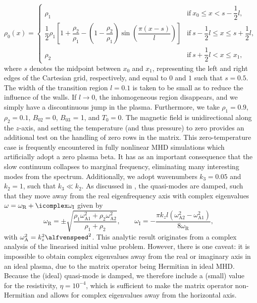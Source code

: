 \begin{equation}
  \rho_0(x) =
  \begin{cases}
    \rho_1 &\text{if}~x_0 \leq x < s - \dfrac{1}{2}l, \\
    \dfrac{1}{2}\rho_1\left[
      1 + \dfrac{\rho_2}{\rho_1} - \left(1 - \dfrac{\rho_2}{\rho_1}\right)\sin\left(\dfrac{\pi(x - s)}{l}\right)
    \right] &\text{if}~s - \dfrac{1}{2}l \leq x \leq s + \dfrac{1}{2}l, \\
    \rho_2 &\text{if}~s + \dfrac{1}{2}l < x \leq x_1,
  \end{cases}
\end{equation}
where $s$ denotes the midpoint between $x_0$ and $x_1$, representing the left and right edges of the Cartesian grid, respectively, and equal to $0$ and $1$ such that $s = 0.5$. The width of the transition region $l = 0.1$ is taken to be small as to reduce the influence of the walls. If $l \rightarrow 0$, the inhomogeneous region disappears, and we simply have a discontinuous jump in the plasma. Furthermore, we take $\rho_1 = 0.9$, $\rho_2 = 0.1$, $B_{02} = 0$, $B_{03}$ = 1, and $T_0 = 0$. The magnetic field is unidirectional along the $z$-axis, and setting the temperature (and thus pressure) to zero provides an additional test on the handling of zero rows in the matrix. This zero-temperature case is frequently encountered in fully nonlinear MHD simulations which artificially adopt a zero plasma beta. It has as an important consequence that the slow continuum collapses to marginal frequency, eliminating many interesting modes from the spectrum. Additionally, we adopt wavenumbers $k_3 = 0.05$ and $k_2 = 1$, such that $k_3 \ll k_2$. As discussed in \citet{book_priest}, the quasi-modes are damped, such that they move away from the real eigenfrequency axis with complex eigenvalues $\omega = \omega_\text{R} + \icomplex \omega_\text{I}$ given by
\begin{equation} \label{eq: quasimode}
  \omega_\text{R} = \pm \sqrt{\frac{\rho_1 \omega_\text{A1}^2 + \rho_2 \omega_\text{A2}^2}{\rho_1 + \rho_2}},
  \qquad
  \omega_\text{I} = -\frac{\pi k_z l \left(\omega_\text{A2}^2 - \omega_\text{A1}^2\right)}{8\omega_\text{R}},
\end{equation}
with $\omega_\text{A}^2 = k_z^2 \alfvenspeed^2$. This analytic result originates from a complex analysis of the linearised initial value problem. However, there is one caveat: it is impossible to obtain complex eigenvalues away from the real or imaginary axis in an ideal plasma, due to the matrix operator being Hermitian in ideal MHD. Because the (ideal) quasi-mode is damped, we therefore include a (small) value for the resistivity, $\eta = 10^{-4}$, which is sufficient to make the matrix operator non-Hermitian and allows for complex eigenvalues away from the horizontal axis.

